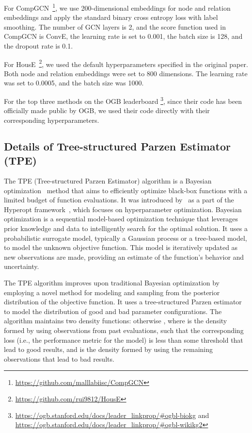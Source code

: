 \documentclass[11pt,a4paper]{article}
\begin{document}
  
  For CompGCN~\cite{vashishth2019composition}\footnote{\url{https://github.com/malllabiisc/CompGCN}}, 
  we use 200-dimensional embeddings for node and relation embeddings
  and apply the standard binary cross entropy loss with label smoothing.
  The number of GCN layers is 2,
  and the score function used in CompGCN is ConvE,
  the learning rate is set to 0.001,
  the batch size is 128, and the dropout rate is 0.1.
  
For HousE~\cite{li2022house}\footnote{\url{https://github.com/rui9812/HousE}}, 
we used the default hyperparameters specified in the original paper. 
Both node and relation embeddings were set to 800 dimensions. 
The learning rate was set to 0.0005, and the batch size was 1000.

  For the top three methods on the OGB leaderboard
  \footnote{\url{https://ogb.stanford.edu/docs/leader_linkprop/\#ogbl-biokg} and \url{https://ogb.stanford.edu/docs/leader_linkprop/\#ogbl-wikikg2}}, 
  since their code has been officially made public by OGB, 
  we used their code directly with their corresponding hyperparameters.




  
  \subsection{Details of Tree-structured Parzen Estimator (TPE)}
  \label{app:tpe}
  
  The TPE (Tree-structured Parzen Estimator) algorithm is a Bayesian optimization~\cite{snoek2012practical} method that aims to efficiently optimize black-box functions with a limited budget of function evaluations. It was introduced by~\cite{bergstra2011algorithms} as a part of the Hyperopt framework~\cite{bergstra2015hyperopt}, which focuses on hyperparameter optimization.
  Bayesian optimization is a sequential model-based optimization technique that leverages prior knowledge and data to intelligently search for the optimal solution. It uses a probabilistic surrogate model, typically a Gaussian process or a tree-based model, to model the unknown objective function. This model is iteratively updated as new observations are made, providing an estimate of the function's behavior and uncertainty.
  
  The TPE algorithm improves upon traditional Bayesian optimization by employing a novel method for modeling and sampling from the posterior distribution of the objective function. 
  It uses a tree-structured Parzen estimator to model the distribution of good and bad parameter configurations. 
  The algorithm maintains two density functions: 
   otherwise ,
where  is the density formed by using observations  from past evaluations, 
  such that the corresponding loss (i.e., the performance metric for the model) is less than some threshold  that lead to good results, 
  and  is the density formed by using the remaining observations that lead to bad results. 
  
\end{document}
